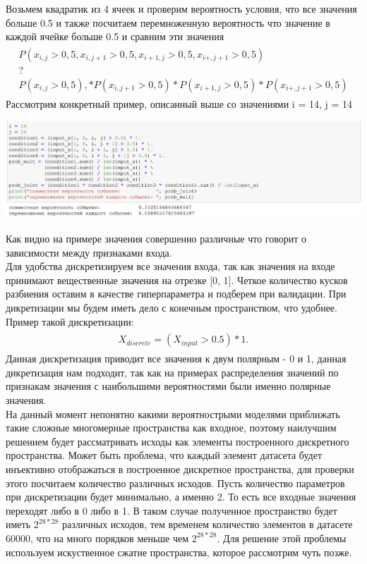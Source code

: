 Возьмем квадратик из 4 ячеек и проверим вероятность условия, что все значения больше 0.5 и также посчитаем перемноженную вероятность что значение в каждой ячейке больше 0.5 и сравним эти значения
\begin{gather}
\begin{aligned}  
P(x_{i,j} > 0,5, x_{i,j+1} > 0,5, x_{i+1,j} > 0,5, x_{i+,j+1} > 0,5) \\
? \\
P(x_{i,j} > 0,5), * P(x_{i,j+1} > 0,5) * P(x_{i+1,j} > 0,5) * P(x_{i+,j+1} > 0,5)
\end{aligned}
\end{gather}
Рассмотрим конкретный пример, описанный выше со значениями i = 14, j = 14
\begin{center}
    \includegraphics[scale=0.6]{images/x_independency.png}
\end{center}
Как видно на примере значения совершенно различные что говорит о зависимости между признаками входа. \\
Для удобства дискретизируем все значения входа, так как значения на входе принимают вещественные значения на отрезке [0, 1]. Четкое количество кусков разбиения оставим в качестве гиперпараметра и подберем при валидации. При дикретизации мы будем иметь дело с конечным пространством, что удобнее. Пример такой дискретизации:
\begin{gather}
\begin{aligned}  
X_{discrete} = (X_{input} > 0.5) * 1.
\end{aligned}
\end{gather}
Данная дискретизация приводит все значения к двум полярным - 0 и 1, данная дикретизация нам подходит, так как на примерах распределения значений по признакам значения с наибольшими вероятностями были именно полярные значения. \\
На данный момент непонятно какими вероятнострыми моделями приближать такие сложные многомерные пространства как входное, поэтому наилучшим решением будет рассматривать исходы как элементы построенного дискретного пространства. Может быть проблема, что каждый элемент датасета будет инъективно отображаться в построенное дискретное пространства, для проверки этого посчитаем количество различных исходов. Пусть количество параметров при дискретизации будет минимально, а именно 2. То есть все входные значения переходят либо в 0 либо в 1. В таком случае полученное пространство будет иметь $2^{28*28}$ различных исходов, тем временем количество элементов в датасете 60000, что на много порядков меньше чем $2^{28*28}$. Для решение этой проблемы используем искуственное сжатие пространства, которое рассмотрим чуть позже.
